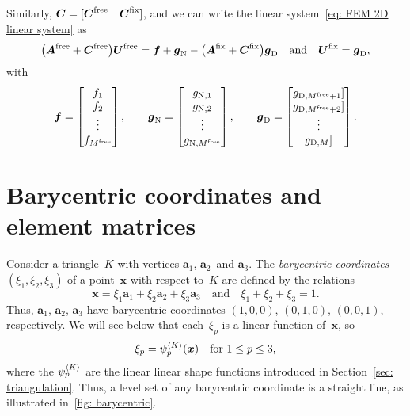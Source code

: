 Similarly, $\boldsymbol{C}=[\boldsymbol{C}^{\mathrm{free}}\quad\boldsymbol{C}^{\mathrm{fix}}]$, and 
we can write the linear system~\eqref{eq: FEM 2D linear system} as
\begin{equation}\label{eq: 2D FEM linear system}
\bigl(\boldsymbol{A}^{\mathrm{free}}+\boldsymbol{C}^{\mathrm{free}}\bigr)\boldsymbol{U}^{\mathrm{free}}
    =\boldsymbol{f}+\boldsymbol{g}_{\mathrm{N}}
-\bigl(\boldsymbol{A}^{\mathrm{fix}}+\boldsymbol{C}^{\mathrm{fix}}\bigr)\boldsymbol{g}_{\mathrm{D}}
\quad\text{and}\quad
\boldsymbol{U}^{\mathrm{fix}}=\boldsymbol{g}_{\mathrm{D}},
\end{equation}
with
\[
\boldsymbol{f}=\begin{bmatrix}f_1\\ f_2\\ \vdots\\ f_{M^{\mathrm{free}}}\end{bmatrix},
\qquad
\boldsymbol{g}_{\mathrm{N}}=\begin{bmatrix}
g_{\mathrm{N},1}\\ g_{\mathrm{N},2}\\ \vdots\\ 
g_{\mathrm{N},M^{\mathrm{free}}}\end{bmatrix},
\qquad
\boldsymbol{g}_{\mathrm{D}}=\begin{bmatrix}
g_{\mathrm{D},M^{\mathrm{free}}+1}]\\ g_{\mathrm{D},M^{\mathrm{free}}+2}]\\ \vdots\\
g_{\mathrm{D},M}] 
\end{bmatrix}.
\]

\section{Barycentric coordinates and element matrices}\label{sec: barycentric}

Consider a triangle~$K$ with vertices $\boldsymbol{a}_1$, 
$\boldsymbol{a}_2$~and $\boldsymbol{a}_3$.  The \emph{barycentric coordinates} 
$(\xi_1,\xi_2,\xi_3)$ of a point~$\boldsymbol{x}$ with respect to~$K$ are 
defined by the relations
\[
\boldsymbol{x}=\xi_1\boldsymbol{a}_1+\xi_2\boldsymbol{a}_2
    +\xi_3\boldsymbol{a}_3
    \quad\text{and}\quad
\xi_1+\xi_2+\xi_3=1.    
\]
Thus, $\boldsymbol{a}_1$, $\boldsymbol{a}_2$, $\boldsymbol{a}_3$ have
barycentric coordinates $(1,0,0)$, $(0,1,0)$, $(0,0,1)$, respectively. We will 
see below that each~$\xi_p$ is a linear function of~$\boldsymbol{x}$, so 
\begin{equation}\label{eq: xi psi}
\xi_p=\psi_p^{\langle K\rangle}(\boldsymbol{x})
    \quad\text{for $1\le p\le 3$,}
\end{equation}
where the $\psi_p^{\langle K\rangle}$ are the linear linear shape functions introduced in 
Section~\ref{sec: triangulation}.  Thus, a level set of any
barycentric coordinate is a straight line, as illustrated 
in~\ref{fig: barycentric}.

